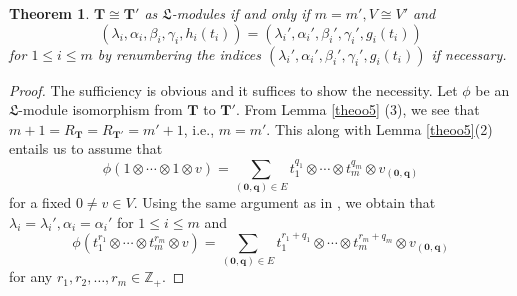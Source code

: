 \documentclass[12pt,leqno,amscd,amsfonts,amssymb]{amsart}
\def\a{\alpha}
\def\b{\beta}
\def\r{\gamma}
\def\Z{\mathbb{Z}}
\numberwithin{equation}{section}
\newtheorem{theo}{Theorem}[section]
\begin{document}
\begin{theo}\label{theo4}
$\bm{T}\cong \bm{T'}$ as $\mathfrak L$-modules if and only if $m=m', V\cong V'$ and 
$$(\lambda_i, \alpha_i, \b_i, \r_i,  h_i(t_i))=(\lambda_i', \alpha_i', \beta_i', \gamma_i',g_i(t_i))$$ for $1\leq i\leq m$ by renumbering the indices $(\lambda_i', \alpha_i', \beta_i', \gamma_i', g_i(t_i))$ if necessary.
\end{theo}	
\begin{proof}
The sufficiency is obvious and it suffices to show the necessity. Let $\phi$ be an
$\mathfrak L$-module isomorphism from $\bm{T}$ to $\bm{T'}$. From Lemma \ref{theoo5} (3), we see that $m+1=R_{\bm{T}}=R_{\bm{T'}}=m'+1$, i.e., $m=m'$. This along with Lemma \ref{theoo5}(2) entails us to assume that
$$\phi(1\otimes\cdots \otimes1 \otimes v)=\sum_{(\mathbf{0}, \mathbf{q})\in E}t_1^{q_1}\otimes\cdots \otimes t_m^{q_m} \otimes v_{(\mathbf{0}, \mathbf{q})}$$
for a fixed $0\neq v\in V$. Using the same argument as in   \cite[Theorem 3.6]{CX}, we obtain that $\lambda_i=\lambda_i', \a_i=\a_i'$ for $1\leq i \leq m$ and 
\begin{equation}\label{bmm}
\phi(t_1^{r_1}\otimes\cdots \otimes t_m^{r_m} \otimes v)=\sum_{(\mathbf{0}, \mathbf{q})\in E}t_1^{r_1+q_1}\otimes\cdots \otimes t_m^{r_m+q_m} \otimes v_{(\mathbf{0}, \mathbf{q})}
\end{equation}
for any $r_1, r_2, \ldots, r_m\in\Z_+$.


\end{proof}
\end{document}
